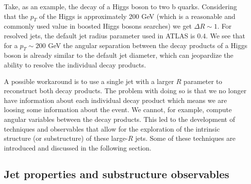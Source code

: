 Take, as an example, the decay of a Higgs boson to two b quarks. Considering that the $p_T$ of the Higgs is approximately $200$ GeV (which is a reasonable and commonly used value in boosted Higgs bosons searches) we get $\Delta R \sim 1$. For resolved jets, the default jet radius parameter used in ATLAS is $0.4$. We see that for a $p_T \sim 200$ GeV the angular separation between the decay products of a Higgs boson is already similar to the default jet diameter, which can jeopardize the ability to resolve the individual decay products.


A possible workaround is to use a single jet with a larger $R$ parameter to reconstruct both decay products. The problem with doing so is that we no longer have information about each individual decay product which means we are loosing some information about the event. We cannot, for example, compute angular variables between the decay products. This led to the development of techniques and observables that allow for the exploration of the intrinsic structure (or substructure) of these large-$R$ jets. Some of these techniques are introduced and discussed in the following section.  

\subsection{Jet properties and substructure observables}
\label{section_jet_sub}



